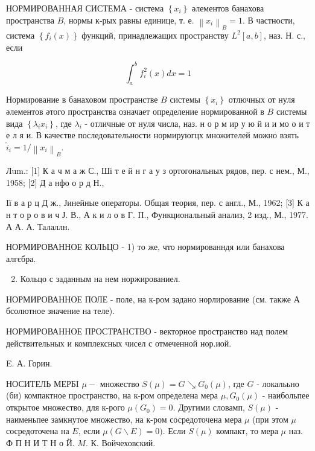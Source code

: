 \documentclass[10pt]{article}
\begin{document}
НОРМИРОВАННАЯ СИСТЕМА - система $\left\{x_{i}\right\}$ әлементов банахова пространства $B$, нормы к-рых равны единице, т. е. $\left\|x_{i}\right\|_{B}=1$. В частности, система $\left\{f_{i}(x)\right\}$ функций, принадлежащих пространству $L^{2}[a, b]$, наз. Н. с., если



\[

\int_{a}^{b} f_{i}^{2}(x) d x=1

\]



Нормирование в банаховом пространстве $B$ системы $\left\{x_{i}\right\}$ отлючных от нуля әлементов әтого пространства означает определение нормированной в $B$ системы вида $\left\{\lambda_{i} x_{i}\right\}$, где $\lambda_{i}$ - отличные от нуля числа, наз. н о р м ир у ю й и и мо о и т е л я и. В качестве последовательности нормируюгцх множителей можно взять $\hat{i}_{i}=1 /\left\|x_{i}\right\|_{B}$.



Лum.: [1] К а ч м а ж С., Ші т е й н г а у з ортогональных рядов, пер. с нем., М., 1958; [2] Д а нфо о р д Н.,

Iї в а р ц Д ж., Јинейные операторы. Общая теория, пер. с англ., М., 1962; [3] К а н т о р о в и ч Ј. В., А к и л о в Г. П., Функциональный анализ, 2 изд., М., 1977. А А. А. Талаллн.



НОРМИРОВАННОЕ КОЛЬЦО - 1) то же, что нормированндя или банахова алгєбра.



\begin{enumerate}

  \setcounter{enumi}{1}

  \item Кольцо с заданным на нем норжированиел.

\end{enumerate}



НОРМИРОВАННОЕ ПОЛЕ - поле, на к-ром задано норлирование (см. также А бсолютное значение на теле).



НОРМИРОВАННОЕ ПРОСТРАНСТВО - векторное пространство над полем действительных и комплексных чисел с отмеченной нор.иой.



E. А. Горин.



НОСИТЕЛЬ МЕРБI $\mu-$ множество $S(\mu)=G \searrow G_{0}(\mu)$, где $G$ - локалььно (би) компактное пространство, на к-ром определена мера $\mu, G_{0}(\mu)$ - наибольпее открытое множество, для к-рого $\mu\left(G_{0}\right)=0$. Другими словамп, $S(\mu)$ - наименьпее замкнутое множество, на к-ром сосредоточена мера $\mu$ (при этом $\mu$ сосредоточена на $E$, если $\mu(G \backslash E)=0)$. Если $S(\mu)$ компакт, то мера $\mu$ наз. Ф П Н И Т Н о Й. $M$. К. Войчеховский.
\end{document}
